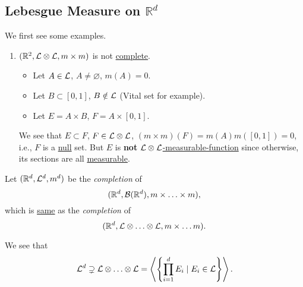 \subsection{Lebesgue Measure on \(\mathbb{R} ^d\)}
\begin{eg}
	We first see some examples.
	\begin{enumerate}
		\item \((\mathbb{\MakeUppercase{r}} ^{2} , \mathcal{\MakeUppercase{l}} \otimes \mathcal{\MakeUppercase{l}}, m\times m)\) is not
		      \hyperref[def:complete-measure-space]{complete}.
		      \begin{itemize}
			      \item Let \(A\in \mathcal{\MakeUppercase{l}} \), \(A\neq \varnothing \), \(m(A) = 0\).
			      \item Let \(B\subset [0, 1]\), \(B \notin \mathcal{\MakeUppercase{l}} \) (Vital set for example).
			      \item Let \(E = A\times B\), \(F = A \times [0, 1]\).
		      \end{itemize}
		      We see that \(E\subset F\), \(F \in \mathcal{\MakeUppercase{l}} \otimes \mathcal{\MakeUppercase{l}} \), \((m\times m)(F)=m(A)m([0, 1]) = 0\), i.e.,
		      \(F\) is a \hyperref[def:mu-null-set]{null} set. But \(E\) is \textbf{not}
		      \hyperref[def:A-measurable-function]{\(\mathcal{\MakeUppercase{l}} \otimes \mathcal{\MakeUppercase{l}} \)-measurable-function} since otherwise,
		      its sections are all \hyperref[def:A-measurable-function]{measurable}.
	\end{enumerate}
\end{eg}

\begin{definition}
	Let \((\mathbb{\MakeUppercase{r}} ^d, \mathcal{\MakeUppercase{l}} ^d, m^d)\) be the \emph{completion} of
	\[
		(\mathbb{\MakeUppercase{r}} ^d, \mathcal{\MakeUppercase{b}} (\mathbb{\MakeUppercase{r}} ^d), m\times \ldots \times m ),
	\]
	which is \underline{same} as the \emph{completion} of
	\[
		(\mathbb{\MakeUppercase{r}} ^d, \mathcal{\MakeUppercase{l}} \otimes \ldots \otimes \mathcal{\MakeUppercase{l}}, m\times \ldots m).
	\]
\end{definition}

\begin{remark}
	We see that
	\[
		\mathcal{\MakeUppercase{l}} ^d \supsetneq \mathcal{\MakeUppercase{l}} \otimes \ldots \otimes \mathcal{\MakeUppercase{l}}
		= \left< \left\{ \prod\limits_{i=1}^{d}E_{i} \mid E_{i} \in \mathcal{\MakeUppercase{l}}  \right\} \right>.
	\]
\end{remark}

